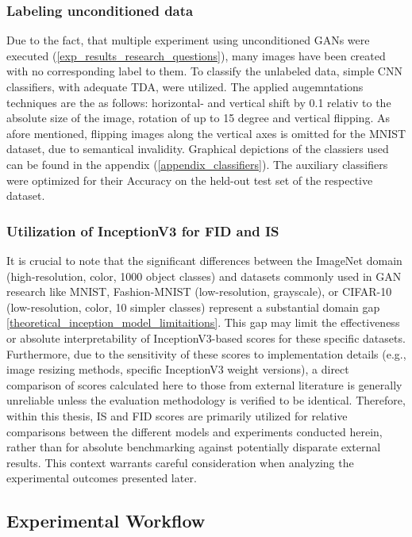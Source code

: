 \subsubsection{Labeling unconditioned data}\label{body_experiment_labeling_data}
Due to the fact, that multiple experiment using unconditioned GANs were executed (\ref{exp_results_research_questions}), many images have been created with no corresponding label to them. To classify the unlabeled data, simple CNN classifiers, with adequate TDA, were utilized. The applied augemntations techniques are the as follows: horizontal- and vertical shift by 0.1 relativ to the absolute size of the image, rotation of up to 15 degree and vertical flipping. As afore mentioned, flipping images along the vertical axes is omitted for the MNIST dataset, due to semantical invalidity. Graphical depictions of the classiers used can be found in the appendix (\ref{appendix_classifiers}). The auxiliary classifiers were optimized for their Accuracy on the held-out test set of the respective dataset.\\


\subsubsection{Utilization of InceptionV3 for FID and IS}\label{body_experiment_inception_model}
It is crucial to note that the significant differences between the ImageNet domain (high-resolution, color, 1000 object classes) and datasets commonly used in GAN research like MNIST, Fashion-MNIST (low-resolution, grayscale), or CIFAR-10 (low-resolution, color, 10 simpler classes) represent a substantial domain gap \ref{theoretical_inception_model_limitaitions}. This gap may limit the effectiveness or absolute interpretability of InceptionV3-based scores for these specific datasets. Furthermore, due to the sensitivity of these scores to implementation details (e.g., image resizing methods, specific InceptionV3 weight versions), a direct comparison of scores calculated here to those from external literature is generally unreliable unless the evaluation methodology is verified to be identical. Therefore, within this thesis, IS and FID scores are primarily utilized for relative comparisons between the different models and experiments conducted herein, rather than for absolute benchmarking against potentially disparate external results. This context warrants careful consideration when analyzing the experimental outcomes presented later.


\subsection{Experimental Workflow}\label{body_experiment_succession}

